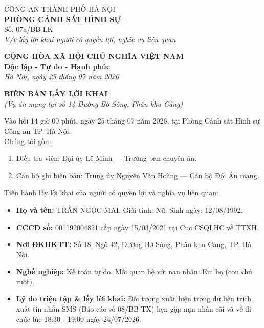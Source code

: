 \documentclass[12pt,a4paper]{article}
\begin{document}
\noindent
\begin{minipage}[t]{0.45\textwidth}
    \begin{center}
        \small
        CÔNG AN THÀNH PHỐ HÀ NỘI\\
        \textbf{\underline{PHÒNG CẢNH SÁT HÌNH SỰ}}\\[0.1cm]
        Số: 07a/BB-LK\\
        \textit{V/v lấy lời khai người có quyền lợi, nghĩa vụ liên quan}
    \end{center}
\end{minipage}
\hfill
\begin{minipage}[t]{0.52\textwidth}
    \begin{center}
        \small
        \textbf{CỘNG HÒA XÃ HỘI CHỦ NGHĨA VIỆT NAM}\\
        \textbf{\underline{Độc lập - Tự do - Hạnh phúc}}\\[0.1cm]
        \textit{Hà Nội, ngày 25 tháng 07 năm 2026}
    \end{center}
\end{minipage}

\vspace{0.6cm}

\begin{center}
    \textbf{\large BIÊN BẢN LẤY LỜI KHAI}\\
    \textit{(Vụ án mạng tại số 14 Đường Bờ Sông, Phân khu Cảng)}
\end{center}

\vspace{0.3cm}

\noindent Vào hồi 14 giờ 00 phút, ngày 25 tháng 07 năm 2026, tại Phòng Cảnh sát Hình sự Công an TP. Hà Nội.\\
Chúng tôi gồm:
\begin{enumerate}[label=\arabic*., leftmargin=1.5cm]
    \item Điều tra viên: Đại úy Lê Minh — Trưởng ban chuyên án.
    \item Cán bộ ghi biên bản: Trung úy Nguyễn Văn Hoàng — Cán bộ Đội Án mạng.
\end{enumerate}

\noindent Tiến hành lấy lời khai của người có quyền lợi và nghĩa vụ liên quan:
\begin{itemize}[leftmargin=1.5cm]
    \item \textbf{Họ và tên:} TRẦN NGỌC MAI. Giới tính: Nữ. Sinh ngày: 12/08/1992.
    \item \textbf{CCCD số:} 001192004821 cấp ngày 15/03/2021 tại Cục CSQLHC về TTXH.
    \item \textbf{Nơi ĐKHKTT:} Số 18, Ngõ 42, Đường Bờ Sông, Phân khu Cảng, TP. Hà Nội.
    \item \textbf{Nghề nghiệp:} Kế toán tự do. Mối quan hệ với nạn nhân: Em họ (con chú ruột).
    \item \textbf{Lý do triệu tập \& lấy lời khai:} Đối tượng xuất hiện trong dữ liệu trích xuất tin nhắn SMS (Báo cáo số 08/BB-TX) hẹn gặp nạn nhân cãi vã về di chúc lúc 18:30 - 19:00 ngày 24/07/2026.
\end{itemize}
\end{document}
